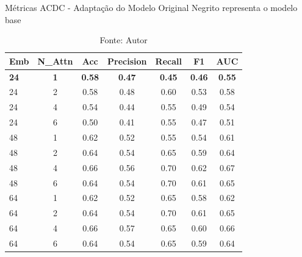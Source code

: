 \begin{table}[htbp]
\centering
\caption{Métricas ACDC - Adaptação do Modelo Original
\newline Negrito representa o modelo base}
\begin{tabular}{lcccccc}
\toprule
\textbf{Emb} & \textbf{N\_Attn} & \textbf{Acc} & \textbf{Precision} & \textbf{Recall} & \textbf{F1} & \textbf{AUC} \\
\midrule
\textbf{24} & \textbf{1} & \textbf{0.58} & \textbf{0.47} & \textbf{0.45} & \textbf{0.46} & \textbf{0.55} \\
24 & 2 & 0.58 & 0.48 & 0.60 & 0.53 & 0.58 \\
24 & 4 & 0.54 & 0.44 & 0.55 & 0.49 & 0.54 \\
24 & 6 & 0.50 & 0.41 & 0.55 & 0.47 & 0.51 \\
\hline
48 & 1 & 0.62 & 0.52 & 0.55 & 0.54 & 0.61 \\
48 & 2 & 0.64 & 0.54 & 0.65 & 0.59 & 0.64 \\
48 & 4 & 0.66 & 0.56 & 0.70 & 0.62 & 0.67 \\
48 & 6 & 0.64 & 0.54 & 0.70 & 0.61 & 0.65 \\
\hline
64 & 1 & 0.62 & 0.52 & 0.65 & 0.58 & 0.62 \\
64 & 2 & 0.64 & 0.54 & 0.70 & 0.61 & 0.65 \\
64 & 4 & 0.66 & 0.57 & 0.65 & 0.60 & 0.66 \\
64 & 6 & 0.64 & 0.54 & 0.65 & 0.59 & 0.64 \\
\bottomrule
\end{tabular}
\caption*{Fonte: Autor}
\label{tab:metrics_acdc_orig}
\end{table}


